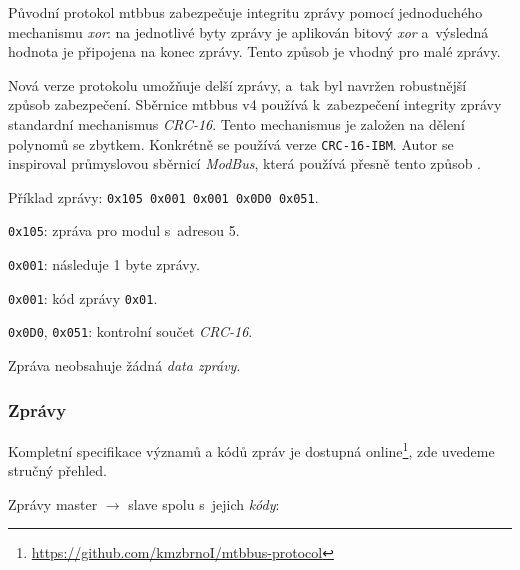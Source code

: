 \begin{enumerate}
Původní protokol \gls{mtbbus} zabezpečuje integritu zprávy pomocí jednoduchého
mechanismu \textit{xor}: na jednotlivé byty zprávy je aplikován bitový
\textit{xor} a~výsledná hodnota je připojena na konec zprávy. Tento způsob je
vhodný pro malé zprávy.

Nová verze protokolu umožňuje delší zprávy, a~tak byl navržen robustnější
způsob zabezpečení. Sběrnice \gls{mtbbus} v4 používá k~zabezpečení
integrity zprávy standardní mechanismus \textit{CRC-16}. Tento mechanismus je
založen na dělení polynomů se zbytkem. Konkrétně se používá verze
\texttt{CRC-16-IBM}. Autor se inspiroval průmyslovou sběrnicí
\textit{ModBus}, která používá přesně tento způsob \cite{modbus-specs}.

\end{enumerate}

Příklad zprávy: \texttt{0x105 0x001 0x001 0x0D0 0x051}.

\begin{compactenum}
\item \texttt{0x105}: zpráva pro modul s~adresou 5.
\item \texttt{0x001}: následuje 1 byte zprávy.
\item \texttt{0x001}: kód zprávy \texttt{0x01}.
\item \texttt{0x0D0}, \texttt{0x051}: kontrolní součet \textit{CRC-16}.
\end{compactenum}

Zpráva neobsahuje žádná \textit{data zprávy}.

\subsubsection{\textbf{Zprávy}} \label{subsub:mtbbus-messages}

Kompletní specifikace významů a kódů zpráv je dostupná
online\footnote{\url{https://github.com/kmzbrnoI/mtbbus-protocol}}, zde uvedeme
struč\-ný přehled.

Zprávy master $\rightarrow$ slave spolu s~jejich \textit{kódy}:

